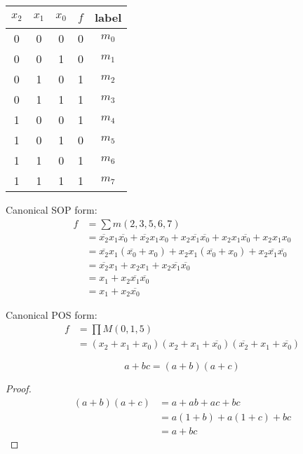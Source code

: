 \documentclass[a4paper, 10pt]{article}
\numberwithin{equation}{section}
\begin{document}
\begin{example}
    \begin{center}
        \begin{tabular}{|c c c|c|c|}
            $x_2$ & $x_1$ & $x_0$ & $f$ & label\\
            \hline
            0 & 0 & 0 & 0 & $m_0$\\
            0 & 0 & 1 & 0 & $m_1$\\
            0 & 1 & 0 & 1 & $m_2$\\
            0 & 1 & 1 & 1 & $m_3$\\
            1 & 0 & 0 & 1 & $m_4$\\
            1 & 0 & 1 & 0 & $m_5$\\
            1 & 1 & 0 & 1 & $m_6$\\
            1 & 1 & 1 & 1 & $m_7$\\
        \end{tabular}
    \end{center}

    Canonical SOP form: 
    \begin{align}
        f&=\sum m(2,3,5,6,7)\\
        &=\overline{x_2}x_1\overline{x_0}+\overline{x_2}x_1x_0+x_2\overline{x_1}\overline{x_0}+x_2x_1\overline{x_0}+x_2x_1x_0\\
        &=\overline{x_2}x_1(\overline{x_0}+x_0)+x_2x_1(\overline{x_0}+x_0)+x_2\overline{x_1}\overline{x_0}\\
        &=\overline{x_2}x_1+x_2x_1+x_2\overline{x_1}\overline{x_0}\\
        &=x_1+x_2\overline{x_1}\overline{x_0}\\
        &=x_1+x_2\overline{x_0}
    \end{align}

    Canonical POS form:
    \begin{align}
        f&=\prod M(0,1,5)\\
        &=(x_2+x_1+x_0)(x_2+x_1+\overline{x_0})(\overline{x_2}+x_1+\overline{x_0})
    \end{align}

\end{example}
\begin{proposition}
    \begin{equation}
        a+bc=(a+b)(a+c)
    \end{equation}
    \begin{proof}
        \begin{align}
            (a+b)(a+c) &= a+ab+ac+bc\\
            &= a(1+b) + a(1+c) + bc\\
            &= a+bc
        \end{align}
    \end{proof}
\end{proposition}
\end{document}
